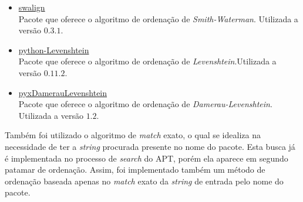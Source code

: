 \begin{itemize}
	\item \href{https://pypi.python.org/pypi/swalign/}{swalign}\\
	Pacote que oferece o algoritmo de ordenação de \textit{Smith-Waterman}. Utilizada a versão $0.3.1$.
	\item \href{https://pypi.python.org/pypi/python-Levenshtein/}{python-Levenshtein}\\
	Pacote que oferece o algoritmo de ordenação de \textit{Levenshtein}.Utilizada a versão $0.11.2$.
	\item \href{https://pypi.python.org/pypi/pyxDamerauLevenshtein/}{pyxDamerauLevenshtein}\\
	Pacote que oferece o algoritmo de ordenação de \textit{Damerau-Levenshtein}. Utilizada a versão $1.2$.
\end{itemize}

Também foi utilizado o algoritmo de \textit{match} exato, o qual se idealiza na necessidade de ter a \textit{string} procurada presente no nome do pacote. Esta busca já é implementada no processo de \textit{search} do APT, porém ela aparece em segundo patamar de ordenação. Assim, foi implementado também um método de ordenação baseada apenas no \textit{match} exato  da \textit{string} de entrada pelo nome do pacote.


